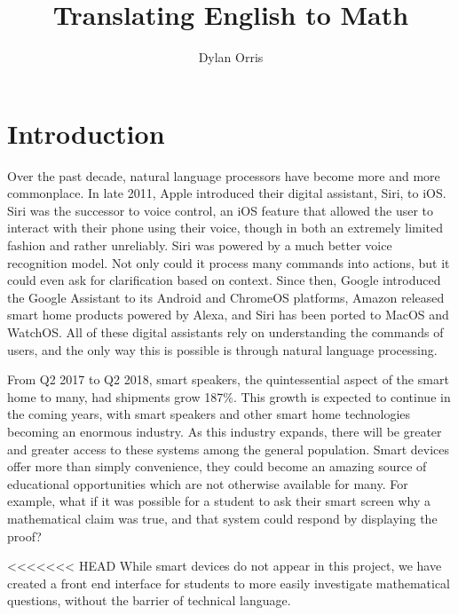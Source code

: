 \documentclass[12pt]{article}
\begin{document}
\title{Translating English to Math}
\author{Dylan Orris}
\maketitle
\tableofcontents
\pagebreak
\section{Introduction}
Over the past decade, natural language processors have become more and more commonplace. In late 2011, Apple introduced their digital assistant, Siri, to iOS. Siri was the successor to voice control, an iOS feature that allowed the user to interact with their phone using their voice, though in both an extremely limited fashion and rather unreliably. Siri was powered by a much better voice recognition model. Not only could it process many commands into actions, but it could even ask for clarification based on context. Since then, Google introduced the Google Assistant to its Android and ChromeOS platforms, Amazon released smart home products powered by Alexa, and Siri has been ported to MacOS and WatchOS. All of these digital assistants rely on understanding the commands of users, and the only way this is possible is through natural language processing. 

From Q2 2017 to Q2 2018, smart speakers, the quintessential aspect of the smart home to many, had shipments grow 187\%. \cite{canalys} %
This growth is expected to continue in the coming years, with smart speakers and other smart home technologies becoming an enormous industry. As this industry expands, there will be greater and greater access to these systems among the general population. Smart devices offer more than simply convenience, they could become an amazing source of educational opportunities which are not otherwise available for many. For example, what if it was possible for a student to ask their smart screen why a mathematical claim was true, and that system could respond by displaying the proof? 

<<<<<<< HEAD
While smart devices do not appear in this project, we have created a front end interface for students to more easily investigate mathematical questions, without the barrier of technical language.
\end{document}
